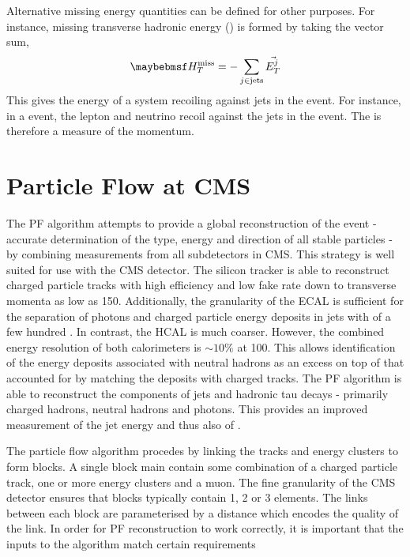 Alternative missing energy quantities can be defined for other purposes. For
instance, missing transverse hadronic energy (\MHT) is formed by taking the
vector sum,
\begin{equation}
\MHT = -\sum_{j \in \textrm{jets}} \vec{E_T^j}
\end{equation}
This gives the energy of a system recoiling against jets in the event. For
instance, in a \Wjets event, the lepton and neutrino recoil against the jets in
the event. The \MHT is therefore a measure of the \PW momentum.


\section{Particle Flow at \ac{CMS}}
\label{sec:reco_pf}
The \ac{PF} algorithm \cite{cms_pf_pas} attempts to provide a global
reconstruction of the event - accurate determination of the type, energy and
direction of all stable particles - by combining measurements from all
subdetectors in \ac{CMS}. This strategy is well suited for use with the \ac{CMS}
detector. The silicon tracker is able to reconstruct charged particle tracks
with high efficiency and low fake rate down to transverse momenta as low as
\unit{150}{\MeV}. Additionally, the granularity of the \ac{ECAL} is sufficient
for the separation of photons and charged particle energy deposits in jets with
\Pt of a few hundred \GeV. In contrast, the \ac{HCAL} is much coarser. However,
the combined energy resolution of both calorimeters is $\sim 10\%$ at
\unit{100}{\GeV}. This allows identification of the energy deposits associated
with neutral hadrons as an excess on top of that accounted for by matching the
deposits with charged tracks. The \ac{PF} algorithm is able to reconstruct the
components of jets and hadronic tau decays - primarily charged hadrons, neutral
hadrons and photons. This provides an improved measurement of the jet energy and
thus also of \MET.

The particle flow algorithm procedes by linking the tracks and energy clusters
to form blocks. A single block main contain some combination of a charged
particle track, one or more energy clusters and a muon. The fine granularity of
the \ac{CMS} detector ensures that blocks typically contain 1, 2 or 3 elements.
The links between each block are parameterised by a distance which encodes the
quality of the link. In order for \ac{PF} reconstruction to work correctly, it
is important that the inputs to the algorithm match certain requirements


